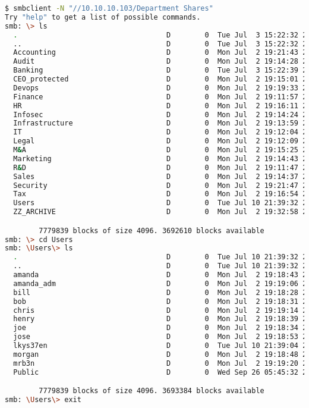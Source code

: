 \documentclass[a4paper]{article}
\begin{document}
        \begin{lstlisting}[language=Bash, caption=Acceso ao recurso compartido: Department Shares]
$ smbclient -N "//10.10.10.103/Department Shares"
Try "help" to get a list of possible commands.
smb: \> ls
  .                                   D        0  Tue Jul  3 15:22:32 2018
  ..                                  D        0  Tue Jul  3 15:22:32 2018
  Accounting                          D        0  Mon Jul  2 19:21:43 2018
  Audit                               D        0  Mon Jul  2 19:14:28 2018
  Banking                             D        0  Tue Jul  3 15:22:39 2018
  CEO_protected                       D        0  Mon Jul  2 19:15:01 2018
  Devops                              D        0  Mon Jul  2 19:19:33 2018
  Finance                             D        0  Mon Jul  2 19:11:57 2018
  HR                                  D        0  Mon Jul  2 19:16:11 2018
  Infosec                             D        0  Mon Jul  2 19:14:24 2018
  Infrastructure                      D        0  Mon Jul  2 19:13:59 2018
  IT                                  D        0  Mon Jul  2 19:12:04 2018
  Legal                               D        0  Mon Jul  2 19:12:09 2018
  M&A                                 D        0  Mon Jul  2 19:15:25 2018
  Marketing                           D        0  Mon Jul  2 19:14:43 2018
  R&D                                 D        0  Mon Jul  2 19:11:47 2018
  Sales                               D        0  Mon Jul  2 19:14:37 2018
  Security                            D        0  Mon Jul  2 19:21:47 2018
  Tax                                 D        0  Mon Jul  2 19:16:54 2018
  Users                               D        0  Tue Jul 10 21:39:32 2018
  ZZ_ARCHIVE                          D        0  Mon Jul  2 19:32:58 2018

		7779839 blocks of size 4096. 3692610 blocks available
smb: \> cd Users
smb: \Users\> ls
  .                                   D        0  Tue Jul 10 21:39:32 2018
  ..                                  D        0  Tue Jul 10 21:39:32 2018
  amanda                              D        0  Mon Jul  2 19:18:43 2018
  amanda_adm                          D        0  Mon Jul  2 19:19:06 2018
  bill                                D        0  Mon Jul  2 19:18:28 2018
  bob                                 D        0  Mon Jul  2 19:18:31 2018
  chris                               D        0  Mon Jul  2 19:19:14 2018
  henry                               D        0  Mon Jul  2 19:18:39 2018
  joe                                 D        0  Mon Jul  2 19:18:34 2018
  jose                                D        0  Mon Jul  2 19:18:53 2018
  lkys37en                            D        0  Tue Jul 10 21:39:04 2018
  morgan                              D        0  Mon Jul  2 19:18:48 2018
  mrb3n                               D        0  Mon Jul  2 19:19:20 2018
  Public                              D        0  Wed Sep 26 05:45:32 2018

		7779839 blocks of size 4096. 3693384 blocks available
smb: \Users\> exit\end{lstlisting}
\end{document}
